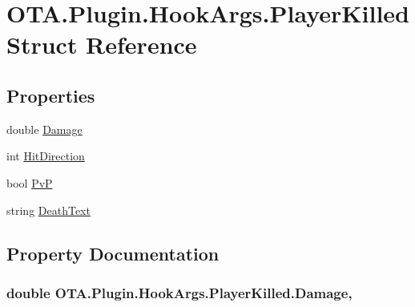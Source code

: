 \hypertarget{struct_o_t_a_1_1_plugin_1_1_hook_args_1_1_player_killed}{}\section{O\+T\+A.\+Plugin.\+Hook\+Args.\+Player\+Killed Struct Reference}
\label{struct_o_t_a_1_1_plugin_1_1_hook_args_1_1_player_killed}
\subsection*{Properties}
\begin{DoxyCompactItemize}
\item 
double \hyperlink{struct_o_t_a_1_1_plugin_1_1_hook_args_1_1_player_killed_a9c66f2096c7cdec64593edcf2d6bca4d}{Damage}
\item 
int \hyperlink{struct_o_t_a_1_1_plugin_1_1_hook_args_1_1_player_killed_a20eb1e7128ee61e5d283d7fe11035683}{Hit\+Direction}
\item 
bool \hyperlink{struct_o_t_a_1_1_plugin_1_1_hook_args_1_1_player_killed_a94a48678328eb9096998fc6149483627}{Pv\+P}
\item 
string \hyperlink{struct_o_t_a_1_1_plugin_1_1_hook_args_1_1_player_killed_afb0150ebc6f8dd1a9e1b029aa5c3bdd9}{Death\+Text}
\end{DoxyCompactItemize}


\subsection{Property Documentation}
\hypertarget{struct_o_t_a_1_1_plugin_1_1_hook_args_1_1_player_killed_a9c66f2096c7cdec64593edcf2d6bca4d}{}
\subsubsection[{Damage}]{\setlength{\rightskip}{0pt plus 5cm}double O\+T\+A.\+Plugin.\+Hook\+Args.\+Player\+Killed.\+Damage\hspace{0.3cm}{\ttfamily [get]}, {\ttfamily [set]}}\label{struct_o_t_a_1_1_plugin_1_1_hook_args_1_1_player_killed_a9c66f2096c7cdec64593edcf2d6bca4d}
\hypertarget{struct_o_t_a_1_1_plugin_1_1_hook_args_1_1_player_killed_afb0150ebc6f8dd1a9e1b029aa5c3bdd9}{}
